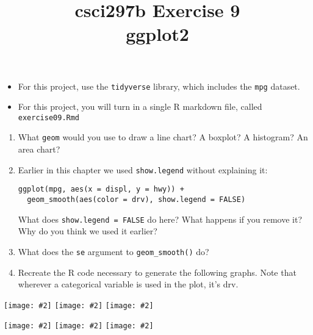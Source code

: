 \documentclass[12pt]{article}
\title{csci297b Exercise 9\\ggplot2
  }
\date{}
\newcommand{\bi}{\begin{itemize}}
\newcommand{\ei}{\end{itemize}}
\newcommand{\li}{\item}
\newcommand{\figg}[2]{\texttt{[image: \#2]}}
\begin{document}
\maketitle

\bi
\li
For this project, use the {\tt tidyverse} library, which includes the {\tt mpg} dataset.
\li
For this project, you will turn in a single R markdown file, called \verb|exercise09.Rmd|

\ei
\begin{enumerate}
\item
What \verb|geom| would you use to draw a line chart? A boxplot? A histogram? An area chart?
\item
Earlier in this chapter we used \verb|show.legend| without explaining it:
\begin{verbatim}
ggplot(mpg, aes(x = displ, y = hwy)) +
  geom_smooth(aes(color = drv), show.legend = FALSE)
\end{verbatim}
What does \verb|show.legend = FALSE| do here? What happens if you remove it? Why do you think we used it earlier?
\item
What does the \verb|se| argument to \verb|geom_smooth()| do?
\item
Recreate the R code necessary to generate the following graphs. Note that wherever a categorical variable is used in the plot, it’s drv.
\end{enumerate}
\figg{0.33}{unnamed-chunk-19-1.png}%
\figg{0.33}{unnamed-chunk-19-2.png}%
\figg{0.33}{unnamed-chunk-19-3.png}

\figg{0.33}{unnamed-chunk-19-4.png}%
\figg{0.33}{unnamed-chunk-19-5.png}%
\figg{0.33}{unnamed-chunk-19-6.png}
\end{document}

